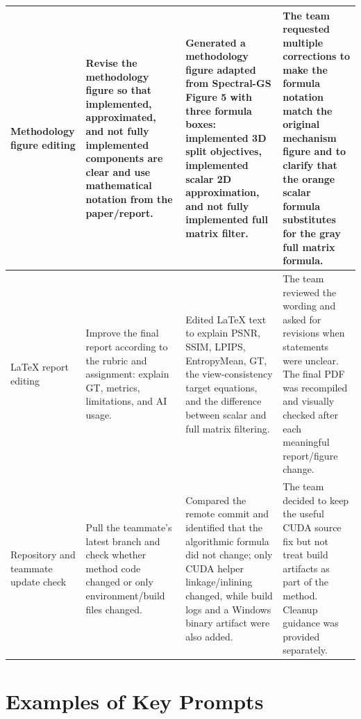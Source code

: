 \documentclass[10pt]{article}
\begin{document}
\begin{tabularx}{\textwidth}{p{}Y Y Y}
\midrule
Methodology figure editing &
Revise the methodology figure so that implemented, approximated, and not fully implemented components are clear and use mathematical notation from the paper/report. &
Generated a methodology figure adapted from Spectral-GS Figure 5 with three formula boxes: implemented 3D split objectives, implemented scalar 2D approximation, and not fully implemented full matrix filter. &
The team requested multiple corrections to make the formula notation match the original mechanism figure and to clarify that the orange scalar formula substitutes for the gray full matrix formula. \\
\midrule
LaTeX report editing &
Improve the final report according to the rubric and assignment: explain GT, metrics, limitations, and AI usage. &
Edited LaTeX text to explain PSNR, SSIM, LPIPS, EntropyMean, GT, the view-consistency target equations, and the difference between scalar and full matrix filtering. &
The team reviewed the wording and asked for revisions when statements were unclear. The final PDF was recompiled and visually checked after each meaningful report/figure change. \\
\midrule
Repository and teammate update check &
Pull the teammate's latest branch and check whether method code changed or only environment/build files changed. &
Compared the remote commit and identified that the algorithmic formula did not change; only CUDA helper linkage/inlining changed, while build logs and a Windows binary artifact were also added. &
The team decided to keep the useful CUDA source fix but not treat build artifacts as part of the method. Cleanup guidance was provided separately. \\
\bottomrule
\end{tabularx}
\normalsize

\section*{Examples of Key Prompts}
\end{document}
